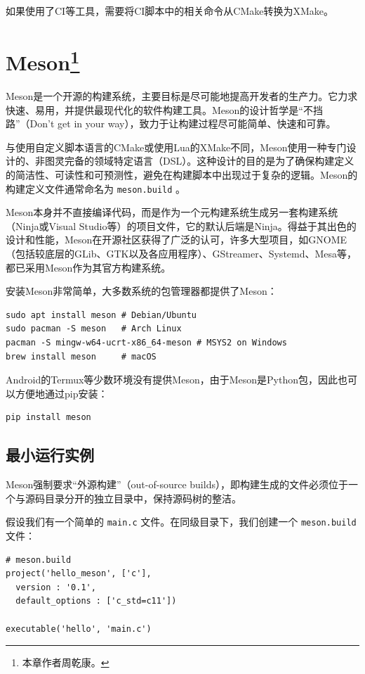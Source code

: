 如果使用了CI等工具，需要将CI脚本中的相关命令从CMake转换为XMake。

\section[Meson]{Meson\protect\footnote{本章作者周乾康。}}\label{sec:meson}

Meson是一个开源的构建系统，主要目标是尽可能地提高开发者的生产力。它力求快速、易用，并提供最现代化的软件构建工具。Meson的设计哲学是“不挡路”（Don't get in your way），致力于让构建过程尽可能简单、快速和可靠。

与使用自定义脚本语言的CMake或使用Lua的XMake不同，Meson使用一种专门设计的、非图灵完备的领域特定语言（DSL）。这种设计的目的是为了确保构建定义的简洁性、可读性和可预测性，避免在构建脚本中出现过于复杂的逻辑。Meson的构建定义文件通常命名为 \texttt{meson.build} 。

Meson本身并不直接编译代码，而是作为一个元构建系统生成另一套构建系统（Ninja或Visual Studio等）的项目文件，它的默认后端是Ninja。得益于其出色的设计和性能，Meson在开源社区获得了广泛的认可，许多大型项目，如GNOME（包括较底层的GLib、GTK以及各应用程序）、GStreamer、Systemd、Mesa等，都已采用Meson作为其官方构建系统。

安装Meson非常简单，大多数系统的包管理器都提供了Meson：
\begin{verbatim}
sudo apt install meson # Debian/Ubuntu
sudo pacman -S meson   # Arch Linux
pacman -S mingw-w64-ucrt-x86_64-meson # MSYS2 on Windows
brew install meson     # macOS
\end{verbatim}

Android的Termux等少数环境没有提供Meson，由于Meson是Python包，因此也可以方便地通过pip安装：
\begin{verbatim}
pip install meson
\end{verbatim}

\subsection{最小运行实例}
Meson强制要求“外源构建”（out-of-source builds），即构建生成的文件必须位于一个与源码目录分开的独立目录中，保持源码树的整洁。

假设我们有一个简单的 \texttt{main.c} 文件。在同级目录下，我们创建一个 \texttt{meson.build} 文件：
\begin{verbatim}
# meson.build
project('hello_meson', ['c'],
  version : '0.1',
  default_options : ['c_std=c11'])

executable('hello', 'main.c')
\end{verbatim}

